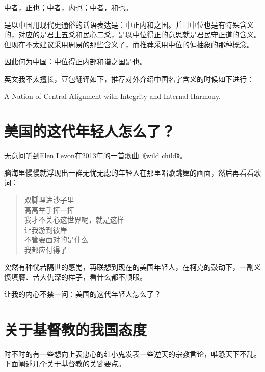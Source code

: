 \documentclass[12pt,oneside]{book}
\newenvironment{shici}{%
\begin{verse}%
\centering\large\hspace{12pt}}%
{\end{verse}}
\begin{document}
中者，正也；中者，内也；中者，和也。

是以中国用现代更通俗的话语表达是：中正内和之国。并且中位也是有特殊含义的，对应的是君上五爻和民心二爻，是以中位得正的意思就是君民守正道的含义。但现在不太建议采用周易的那些含义了，而推荐采用中位的偏抽象的那种概念。

因此何为中国：中位得正内部和谐之国是也。

英文我不太擅长，豆包翻译如下，推荐对外介绍中国名字含义的时候如下进行：

A Nation of Central Alignment with Integrity and Internal Harmony.

\chapter{美国的这代年轻人怎么了？}
无意间听到Elen Levon在2013年的一首歌曲《wild child》。

脑海里慢慢就浮现出一群无忧无虑的年轻人在那里唱歌跳舞的画面，然后再看看歌词：

\begin{shici}
双脚埋进沙子里\\
高高举手挥一挥\\
我才不关心这世界呢，就是这样\\
让我游到彼岸\\
不管要面对的是什么\\
我都应付得了\\
\end{shici}

突然有种恍若隔世的感觉，再联想到现在的美国年轻人，在柯克的鼓动下，一副义愤填膺、苦大仇深的样子，看什么都不顺眼。

让我的内心不禁一问：美国的这代年轻人怎么了？

\chapter{关于基督教的我国态度}
时不时的有一些想向上表忠心的红小鬼发表一些逆天的宗教言论，唯恐天下不乱。下面阐述几个关于基督教的关键要点。
\end{document}
